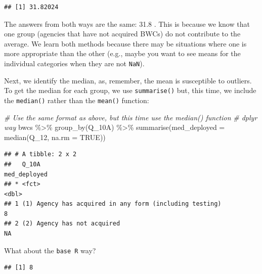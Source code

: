 \documentclass[
]{book}
\newenvironment{Shaded}{\begin{snugshade}}{\end{snugshade}}
\newcommand{\AttributeTok}[1]{\textcolor[rgb]{0.77,0.63,0.00}{#1}}
\newcommand{\CommentTok}[1]{\textcolor[rgb]{0.56,0.35,0.01}{\textit{#1}}}
\newcommand{\ConstantTok}[1]{\textcolor[rgb]{0.00,0.00,0.00}{#1}}
\newcommand{\FunctionTok}[1]{\textcolor[rgb]{0.00,0.00,0.00}{#1}}
\newcommand{\NormalTok}[1]{#1}
\newcommand{\SpecialCharTok}[1]{\textcolor[rgb]{0.00,0.00,0.00}{#1}}
\begin{document}
\begin{verbatim}
## [1] 31.82024
\end{verbatim}

The answers from both ways are the same: 31.8 . This is because we know that one group (agencies that have not acquired BWCs) do not contribute to the average. We learn both methods because there may be situations where one is more appropriate than the other (e.g., maybe you want to see means for the individual categories when they are not \texttt{NaN}).

Next, we identify the median, as, remember, the mean is susceptible to outliers. To get the median for each group, we use \texttt{summarise()} but, this time, we include the \texttt{median()} rather than the \texttt{mean()} function:

\begin{Shaded}
\begin{Highlighting}[]
\CommentTok{\# Use the same format as above, but this time use the median() function }
\CommentTok{\# dplyr way }
\NormalTok{bwcs }\SpecialCharTok{\%\textgreater{}\%} \FunctionTok{group\_by}\NormalTok{(Q\_10A) }\SpecialCharTok{\%\textgreater{}\%} \FunctionTok{summarise}\NormalTok{(}\AttributeTok{med\_deployed =} \FunctionTok{median}\NormalTok{(Q\_12, }\AttributeTok{na.rm =} \ConstantTok{TRUE}\NormalTok{))}
\end{Highlighting}
\end{Shaded}

\begin{verbatim}
## # A tibble: 2 x 2
##   Q_10A                                                   med_deployed
## * <fct>                                                          <dbl>
## 1 (1) Agency has acquired in any form (including testing)            8
## 2 (2) Agency has not acquired                                       NA
\end{verbatim}

What about the \texttt{base\ R} way?

\begin{Shaded}
\end{Shaded}

\begin{verbatim}
## [1] 8
\end{verbatim}
\end{document}

